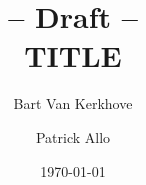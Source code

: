 \documentclass[a4paper,10pt,oneside]{article}
\title	{{\scriptsize -- Draft --}\\
		{\Large TITLE}}
\author{Bart Van Kerkhove \and Patrick Allo}
\date{\today}
\begin{document}
\maketitle



\section{\protect\centering}\label{sect:intro}








%
%
\end{document}
